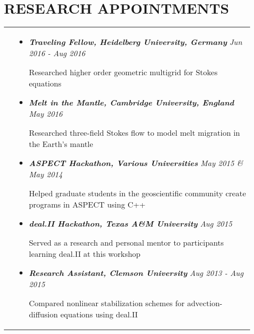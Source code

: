 \documentclass[10pt]{article}
\begin{document}
\section{\textbf{RESEARCH APPOINTMENTS}}
\vspace*{-\baselineskip}
\hskip-1.7in
\begin{tabularx}{1.5\linewidth}{>{\raggedleft\scshape}p{3cm}X}

  &\begin{itemize}
    \setlength\itemsep{.005em}
    
\item \textbf{\textit{Traveling Fellow, Heidelberg University, Germany}} \hspace{33 mm}\textit{Jun 2016 - Aug 2016}

Researched higher order geometric multigrid for Stokes equations
 
            \item \textbf{\textit{Melt in the Mantle, Cambridge University, England}} \hspace{29.5 mm}\textit{May 2016}
            
Researched three-field Stokes flow to model melt migration in the Earth's mantle

             
\item \textbf{\textit{ASPECT Hackathon, Various Universities}} \hspace{46 mm}\textit{May 2015 \& May 2014}
  
            
            Helped graduate students in the geoscientific community create programs in ASPECT using C++ 
             
\item \textbf{\textit{deal.II Hackathon, Texas A\&M University}} \hspace{46 mm}\textit{Aug 2015}
  
            Served as a research and personal mentor to participants learning deal.II at this workshop
            



 \item \textbf{\textit{Research Assistant, Clemson University}}    \hspace{50 mm}\textit{Aug 2013 - Aug 2015}

	Compared nonlinear stabilization schemes for advection-diffusion equations using deal.II
             
  \end{itemize} 
\end{tabularx}
 
\end{document}

